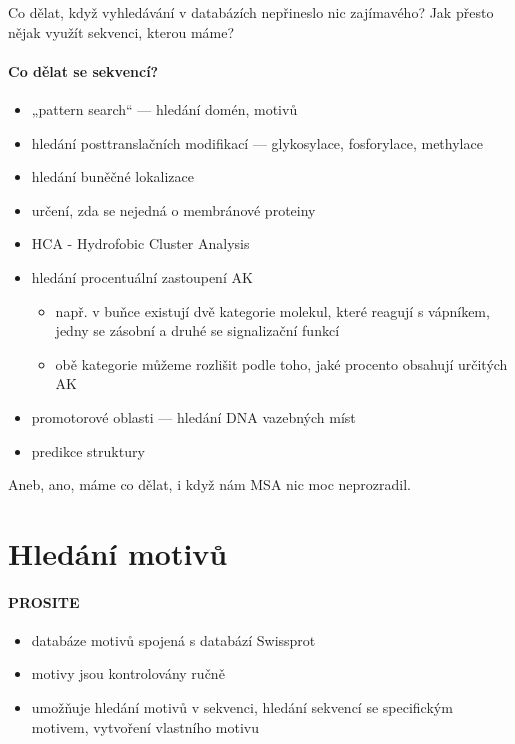 \documentclass[DIV=8]{scrreprt}
\begin{document}
Co dělat, když vyhledávání v databázích nepřineslo nic zajímavého? Jak přesto nějak využít sekvenci, kterou máme?

\paragraph{Co dělat se sekvencí?}
\begin{itemize}[nosep]
    \item „pattern search“ --- hledání domén, motivů
    \item hledání posttranslačních modifikací --- glykosylace, fosforylace, methylace
    \item hledání buněčné lokalizace
    \item určení, zda se nejedná o membránové proteiny
    \item HCA - Hydrofobic Cluster Analysis
    \item hledání procentuální zastoupení AK
\begin{itemize}[nosep]
    \item např. v buňce existují dvě kategorie molekul, které reagují s vápníkem, jedny se zásobní a druhé se signalizační funkcí
    \item obě kategorie můžeme rozlišit podle toho, jaké procento obsahují určitých AK
\end{itemize}

    \item promotorové oblasti --- hledání DNA vazebných míst
    \item predikce struktury
\end{itemize}



Aneb, ano, máme co dělat, i když nám MSA nic moc neprozradil.

\section{Hledání motivů} \label{Hledání motivů}


\paragraph{PROSITE}
\begin{itemize}[nosep]
    \item databáze motivů spojená s databází Swissprot
    \item motivy jsou kontrolovány ručně
    \item umožňuje hledání motivů v sekvenci, hledání sekvencí se specifickým motivem, vytvoření vlastního motivu
\end{itemize}
\end{document}
